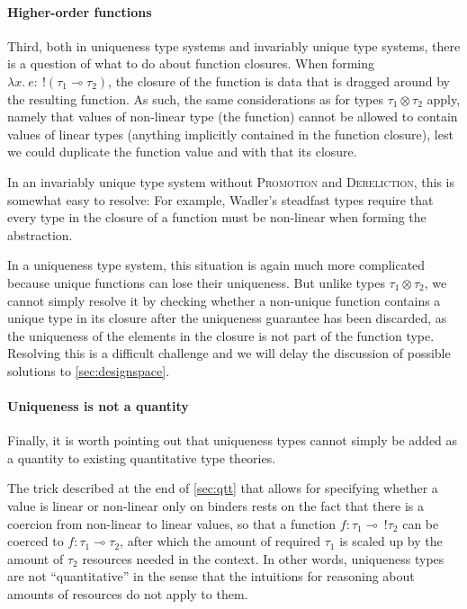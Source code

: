 \paragraph{Higher-order functions} Third, both in uniqueness type systems and invariably unique type systems, there is a question of what to do about function closures. When forming $\lambda x.\ e :\ !(\tau_1 \multimap \tau_2)$, the closure of the function is data that is dragged around by the resulting function. As such, the same considerations as for types $\tau_1 \otimes \tau_2$ apply, namely that values of non-linear type (the function) cannot be allowed to contain values of linear types (anything implicitly contained in the function closure), lest we could duplicate the function value and with that its closure. 

In an invariably unique type system without \textsc{Promotion} and \textsc{Dereliction}, this is somewhat easy to resolve: For example, Wadler's steadfast types require that every type in the closure of a function must be non-linear when forming the abstraction.

In a uniqueness type system, this situation is again much more complicated because unique functions can lose their uniqueness. But unlike types $\tau_1 \otimes \tau_2$, we cannot simply resolve it by checking whether a non-unique function contains a unique type in its closure after the uniqueness guarantee has been discarded, as the uniqueness of the elements in the closure is not part of the function type. Resolving this is a difficult challenge and we will delay the discussion of possible solutions to \cref{sec:designspace}.

\paragraph{Uniqueness is not a quantity} Finally, it is worth pointing out that uniqueness types cannot simply be added as a quantity to existing quantitative type theories. 

The trick described at the end of \cref{sec:qtt} that allows for specifying whether a value is linear or non-linear only on binders rests on the fact that there is a coercion from non-linear to linear values, so that a function $f : \tau_1 \multimap\ !\tau_2$ can be coerced to $f : \tau_1 \multimap \tau_2$, after which the amount of required $\tau_1$ is scaled up by the amount of $\tau_2$ resources needed in the context. In other words, uniqueness types are not ``quantitative'' in the sense that the intuitions for reasoning about amounts of resources do not apply to them.

